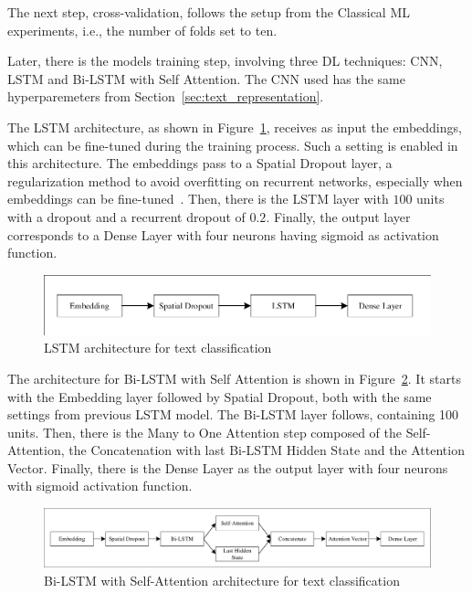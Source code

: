 The next step, cross-validation,  follows the setup from the Classical ML experiments, i.e., the number of folds set to ten. 

Later, there is the models training step, involving three \gls{DL} techniques: \gls{CNN}, \gls{LSTM} and Bi-LSTM with Self Attention. The \gls{CNN} used has the same hyperparemeters  from Section~\ref{sec:text_representation}. 

The \gls{LSTM} architecture, as shown in Figure~\ref{fig:cap4_lstm_model}, receives as input the embeddings, which can be fine-tuned during the training process. Such a setting is enabled in this architecture. The embeddings pass to a Spatial Dropout layer, a regularization method to avoid overfitting on recurrent networks, especially when embeddings can be fine-tuned~\cite{Gal2016}. Then, there is the \gls{LSTM} layer with $100$ units with a dropout and a recurrent dropout of $0.2$. Finally, the output layer corresponds to a Dense Layer with four neurons having sigmoid as activation function.

\begin{figure}[htb]
    \centering
    \caption{LSTM architecture for text classification}
    \label{fig:cap4_lstm_model}
    \includegraphics[width=\textwidth]{images/chapters/cap4_lstm_model.pdf}
\end{figure}

The architecture for Bi-LSTM with Self Attention is shown in Figure~\ref{fig:cap4_bilstm_attention_model}. It starts with the Embedding layer followed by Spatial Dropout, both with the same settings from previous \gls{LSTM} model. The Bi-LSTM layer follows, containing 100 units. Then, there is the Many to One Attention step composed of  the Self-Attention, the Concatenation with last Bi-LSTM Hidden State and the Attention Vector. Finally, there is the Dense Layer as the output layer with four neurons with sigmoid activation function.

\begin{figure}[htb]
    \centering
    \caption{Bi-LSTM with Self-Attention architecture for text classification}
    \label{fig:cap4_bilstm_attention_model}
    \includegraphics[width=\textwidth]{images/chapters/cap4_bi-lstm_self_attention_model.pdf}
\end{figure}

